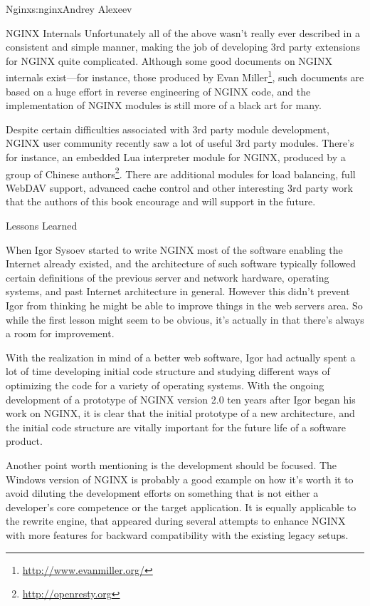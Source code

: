\begin{aosachapter}{Nginx}{s:nginx}{Andrey Alexeev}
\begin{aosasect1}{NGINX Internals}
Unfortunately all of the above wasn't really ever described in a
consistent and simple manner, making the job of developing 3rd party
extensions for NGINX quite complicated. Although some good documents
on NGINX internals exist---for instance, those produced by Evan
Miller\footnote{\url{http://www.evanmiller.org/}}, such documents are
based on a huge effort in reverse engineering of NGINX code, and the
implementation of NGINX modules is still more of a black art for many.

Despite certain difficulties associated with 3rd party module
development, NGINX user community recently saw a lot of useful 3rd
party modules. There's for instance, an embedded Lua interpreter
module for NGINX, produced by a group of Chinese
authors\footnote{\url{http://openresty.org}}. There are additional
modules for load balancing, full WebDAV support, advanced cache
control and other interesting 3rd party work that the authors of this
book encourage and will support in the future.

\end{aosasect1}

\begin{aosasect1}{Lessons Learned}

When Igor Sysoev started to write NGINX most of the software enabling
the Internet already existed, and the architecture of such software
typically followed certain definitions of the previous server and
network hardware, operating systems, and past Internet architecture in
general. However this didn't prevent Igor from thinking he might be
able to improve things in the web servers area. So while the first
lesson might seem to be obvious, it's actually in that there's always
a room for improvement.

With the realization in mind of a better web software, Igor had
actually spent a lot of time developing initial code structure and
studying different ways of optimizing the code for a variety of
operating systems. With the ongoing development of a prototype of
NGINX version 2.0 ten years after Igor began his work on NGINX, it is
clear that the initial prototype of a new architecture, and the
initial code structure are vitally important for the future life of a
software product.

Another point worth mentioning is the development should be
focused. The Windows version of NGINX is probably a good example on
how it's worth it to avoid diluting the development efforts on
something that is not either a developer's core competence or the
target application. It is equally applicable to the rewrite engine,
that appeared during several attempts to enhance NGINX with more
features for backward compatibility with the existing legacy setups.


\end{aosasect1}
\end{aosachapter}
